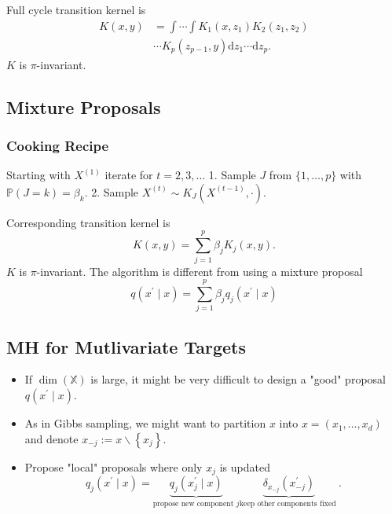 \documentclass{article}
\begin{document}
Full cycle transition kernel is
$$
\begin{aligned}
K(x, y) & =\int \cdots \int K_1\left(x, z_1\right) K_2\left(z_1, z_2\right) \\
& \cdots K_p\left(z_{p-1}, y\right) \mathrm{d} z_1 \cdots \mathrm{d} z_p .
\end{aligned}
$$
$K$ is $\pi$-invariant.

\subsection{Mixture Proposals}
\subsubsection{Cooking Recipe}
Starting with $X^{(1)}$ iterate for $t=2,3, \ldots$
1. Sample $J$ from $\{1, \ldots, p\}$ with $\mathbb{P}(J=k)=\beta_k$.
2. Sample $X^{(t)} \sim K_J\left(X^{(t-1)}, \cdot\right)$.

Corresponding transition kernel is
$$
K(x, y)=\sum_{j=1}^p \beta_j K_j(x, y) .
$$
$K$ is $\pi$-invariant.
The algorithm is different from using a mixture proposal
$$
q\left(x^{\prime} \mid x\right)=\sum_{j=1}^p \beta_j q_j\left(x^{\prime} \mid x\right)
$$

\subsection{MH for Mutlivariate Targets}
\begin{itemize}
    \item If $\operatorname{dim}(\mathbb{X})$ is large, it might be very difficult to design a "good" proposal $q\left(x^{\prime} \mid x\right)$.
    \item As in Gibbs sampling, we might want to partition $x$ into $x=\left(x_1, \ldots, x_d\right)$ and denote $x_{-j}:=x \backslash\left\{x_j\right\}$.
    \item Propose "local" proposals where only $x_j$ is updated
$$
q_j\left(x^{\prime} \mid x\right)=\underbrace{q_j\left(x_j^{\prime} \mid x\right)}_{\text {propose new component } j} \underbrace{\delta_{x_{-j}}\left(x_{-j}^{\prime}\right)}_{\text {keep other components fixed }} .
$$
\end{itemize}
\end{document}
